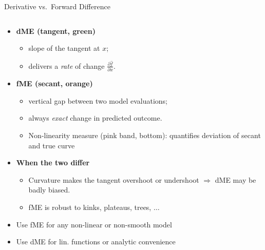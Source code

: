\documentclass[11pt,compress,t,notes=noshow, aspectratio=169, xcolor=table]{beamer}
\begin{document}


\begin{frame}{Derivative vs.\ Forward Difference}

\begin{columns}[T,onlytextwidth]
\begin{column}{0.67\textwidth}
\begin{itemize}%
  \item \textbf{dME (tangent, green)}
        \begin{itemize}
            \item slope of the tangent at \(x\);
            \item delivers a \emph{rate} of change \(\tfrac{\partial\widehat f}{\partial x}\).
        \end{itemize}
  \item \textbf{fME (secant, orange)}
        \begin{itemize}
            \item vertical gap between two model evaluations;
            \item always \emph{exact} change in predicted outcome.
            \item Non-linearity measure (pink band, bottom): quantifies deviation of secant and true curve 
        \end{itemize}

  \item \textbf{When the two differ}
        \begin{itemize}
            \item Curvature makes the tangent overshoot or undershoot  
                  \(\Rightarrow\) dME may be badly biased.
            \item fME is robust to kinks, plateaus, trees, $\dots$
        \end{itemize}
    \item<2-> Use fME for any non-linear or non-smooth model
    \item<2-> Use dME for lin. functions or analytic convenience
\end{itemize}


\end{column}
\end{columns}
\end{frame}
\end{document}
